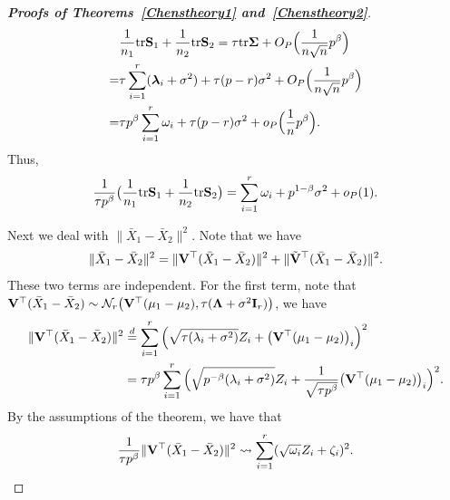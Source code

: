 \documentclass[times,sort&compress,3p]{elsarticle}
\newcommand{\mytr}{ {\rm tr} }
\newcommand{\bfsym}[1]{\ensuremath{\boldsymbol{#1}}}
\def\blambda {\bfsym {\lambda}}        \def\bLambda {\bfsym {\Lambda}}
\theoremstyle{plain}
\theoremstyle{definition}
\theoremstyle{remark}
\begin{document}
\begin{appendices}
\begin{proof}[\textbf{Proofs of Theorems~\ref{Chenstheory1} and~\ref{Chenstheory2}}]
$$\begin{aligned}
        &\frac{1}{n_1}\mytr \BS_1+\frac{1}{n_2}\mytr \BS_2=
    \tau \mytr \bSigma+O_P\Big(\frac{1}{n\sqrt{n}}p^{\beta}\Big)\\
        =&\tau \sum_{i=1}^r (\blambda_i+\sigma^2)+\tau(p-r)\sigma^2+O_P\Big(\frac{1}{n\sqrt{n}}p^{\beta}\Big)\\
        =&\tau p^{\beta} \sum_{i=1}^r \omega_i+\tau(p-r)\sigma^2+o_P\Big(\frac{1}{n}p^{\beta}\Big).
    \end{aligned}
    $$
Thus,
        \begin{equation}\label{eq:kkk1}
        \frac{1}{\tau p^\beta}\big(\frac{1}{n_1}\mytr \BS_1+\frac{1}{n_2}\mytr \BS_2\big)
        =\sum_{i=1}^r \omega_i+p^{1-\beta}\sigma^2+o_P(1).
        \end{equation}

    Next we deal with $\|\bar{X}_1-\bar{X}_2\|^2$.
    Note that we have
    $$
    \|\bar{X}_1-\bar{X}_2\|^2=
    \|\mathbf{V}^\top (\bar{X}_1-\bar{X}_2)\|^2+
    \|\tilde{\mathbf{V}}^\top (\bar{X}_1-\bar{X}_2)\|^2.
    $$
    These two terms are independent.
    For the first term, note that $\BV^\top (\bar{X}_1-\bar{X}_2)\sim \mathcal{N}_r\big(\BV^\top  (\mu_1-\mu_2),\tau (\bLambda+\sigma^2 \BI_r)\big)$, we have
    $$
    \begin{aligned}
        \|\mathbf{V}^\top (\bar{X}_1-\bar{X}_2)\|^2&\overset{d}{=}
        \sum_{i=1}^r \Big(\sqrt{\tau (\lambda_i+\sigma^2)}Z_i+\big(\mathbf{V}^\top  (\mu_1-\mu_2)\big)_i \Big)^2\\
        &=\tau p^{\beta}
        \sum_{i=1}^r
        \Big( \sqrt{p^{-\beta}(\lambda_i+\sigma^2)}Z_i+\frac{1}{\sqrt{\tau p^{\beta}}}\big(\mathbf{V}^\top  (\mu_1-\mu_2)\big)_i \Big)^2.
    \end{aligned}
    $$
    By the assumptions of the theorem,  we have that
    \begin{equation}\label{eq:kkk2}
    \begin{aligned}
        \frac{1}{\tau p^{\beta}}\|\mathbf{V}^\top (\bar{X}_1-\bar{X}_2)\|^2
        \rightsquigarrow
        \sum_{i=1}^r (\sqrt{\omega_i} Z_i+\zeta_i)^2.
    \end{aligned}
    \end{equation}


\end{proof}
\end{appendices}
\end{document}
